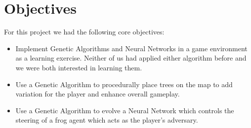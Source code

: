 \section{Objectives}
For this project we had the following core objectives:
\begin{itemize}
\item Implement Genetic Algorithms and Neural Networks in a game environment as a learning exercise. Neither of
us had applied either algorithm before and we were both interested in learning them.
\item Use a Genetic Algorithm to procedurally place trees on the map to add variation for the player
and enhance overall gameplay.
\item Use a Genetic Algorithm to evolve a Neural Network which controls the steering of a frog agent which
acts as the player's adversary.
\end{itemize}